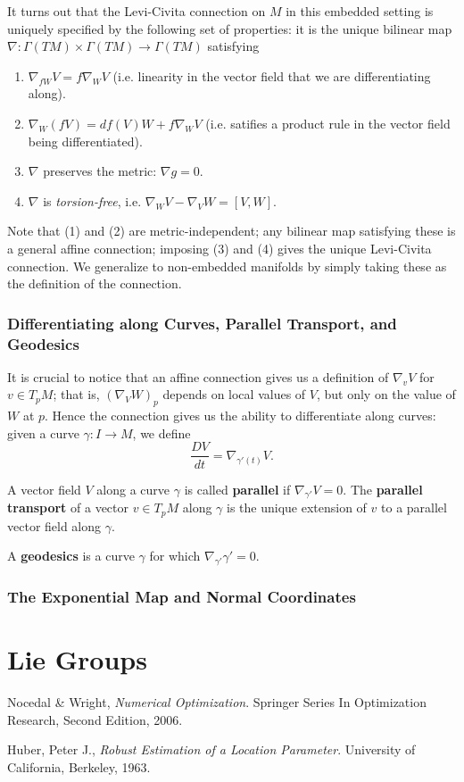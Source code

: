 \documentclass[reqno]{amsart}
\numberwithin{equation}{section}
\begin{document}
It turns out that the Levi-Civita connection on $M$ in this embedded setting
is uniquely specified by the following set of properties: it is the unique bilinear map
$\nabla : \Gamma(TM) \times \Gamma(TM) \to \Gamma(TM)$ satisfying
\begin{enumerate}
    \item $\nabla_{f W} V = f \nabla_W V$ (i.e. linearity in the vector field that we are differentiating along).
    \item $\nabla_W (fV) = df(V)W + f \nabla_W V$ (i.e. satifies a product rule in the vector field being differentiated).
    \item $\nabla$ preserves the metric: $\nabla g = 0$.
    \item $\nabla$ is \emph{torsion-free}, i.e. $\nabla_W V - \nabla_V W = [V, W]$.
\end{enumerate}
Note that (1) and (2) are metric-independent; any bilinear map satisfying these is a general affine connection;
imposing (3) and (4) gives the unique Levi-Civita connection. We generalize to non-embedded manifolds by simply
taking these as the definition of the connection.

\subsubsection{Differentiating along Curves, Parallel Transport, and Geodesics}

It is crucial to notice that an affine connection gives us a definition of $\nabla_v V$ for $v \in T_pM$; that is,
$(\nabla_V W)_p$ depends on local values of $V$, but only on the value of $W$ at $p$. Hence the connection gives
us the ability to differentiate along curves: given a curve $\gamma : I \to M$, we define
$$
    \frac{DV}{dt} = \nabla_{\gamma'(t)} V.
$$

A vector field $V$ along a curve $\gamma$ is called \textbf{parallel} if $\nabla_{\gamma'} V = 0$.
The \textbf{parallel transport} of a vector $v \in T_pM$ along $\gamma$ is the unique extension of $v$
to a parallel vector field along $\gamma$.

A \textbf{geodesics} is a curve $\gamma$ for which $\nabla_{\gamma'} \gamma' = 0$.

\subsubsection{The Exponential Map and Normal Coordinates}

\section{Lie Groups}

\begin{thebibliography}{999}

Nocedal \& Wright,
\emph{Numerical Optimization}.
Springer Series In Optimization Research,
Second Edition,
2006.

Huber, Peter J.,
\emph{Robust Estimation of a Location Parameter}.
University of California, Berkeley,
1963.

\end{thebibliography}
\end{document}
